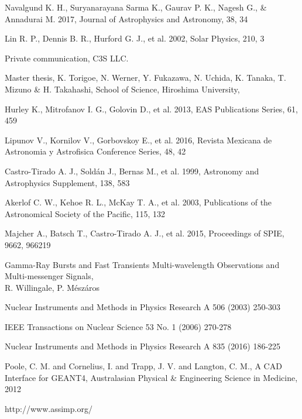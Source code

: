 \documentclass[12pt, a4paper,titlepage]{article}
\numberwithin{equation}{section}
\numberwithin{figure}{section}
\begin{document}
\begin{thebibliography}{99}
 Navalgund K. H., Suryanarayana Sarma K., Gaurav P. K., Nagesh G., \& Annadurai M. 2017, Journal of Astrophysics and Astronomy, 38, 34

 Lin R. P., Dennis B. R., Hurford G. J., et al. 2002, Solar Physics, 210, 3

 Private communication, C3S LLC.

 Master thesis, K. Torigoe, N. Werner, Y. Fukazawa, N. Uchida, K. Tanaka, T. Mizuno \& H. Takahashi, School of Science, Hiroshima University,


 Hurley K., Mitrofanov I. G., Golovin D., et al. 2013, EAS Publications Series, 61, 459 

 Lipunov V., Kornilov V., Gorbovskoy E., et al. 2016, Revista Mexicana de Astronomia y Astrofisica
Conference Series, 48, 42

 Castro-Tirado A. J., Soldán J., Bernas M., et al. 1999, Astronomy and Astrophysics Supplement, 138, 583

 Akerlof C. W., Kehoe R. L., McKay T. A., et al. 2003, Publications of the Astronomical Society of the Pacific, 115, 132

 Majcher A., Batsch T., Castro-Tirado A. J., et al. 2015, Proceedings of SPIE, 9662, 966219

 Gamma-Ray Bursts and Fast Transients
Multi-wavelength Observations and Multi-messenger Signals,\\
R. Willingale, P. Mészáros

 Nuclear Instruments and Methods in Physics Research A 506 (2003) 250-303

 IEEE Transactions on Nuclear Science 53 No. 1 (2006) 270-278

 Nuclear Instruments and Methods in Physics Research A 835 (2016) 186-225

 Poole, C. M. and Cornelius, I. and Trapp, J. V. and Langton, C. M., A CAD Interface for GEANT4, Australasian Physical \& Engineering Science in Medicine, 2012

 http://www.assimp.org/


\end{thebibliography}
\end{document}
